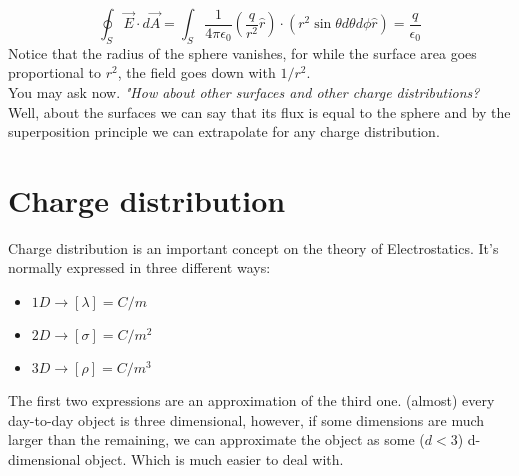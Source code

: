		\begin{equation}
			\oint_S \vec{E} \cdot d\vec{A} = \int_S \frac{1}{4\pi\epsilon_0} \left(\frac{q}{r^2}\hat{r}\right)\cdot(r^2\sin\theta d\theta d\phi \hat{r}) = \frac{q}{\epsilon_0}
		\end{equation}
		Notice that the radius of the sphere vanishes, for while the surface area goes proportional to $r^2$, the field goes down with $1/r^2$.\\
		You may ask now. \textit{"How about other surfaces and other charge distributions?} Well, about the surfaces we can say that its flux is equal to the sphere and by the superposition principle we can extrapolate for any charge distribution. %


\section{Charge distribution}
	Charge distribution is an important concept on the theory of Electrostatics. It's normally expressed in three different ways:
	\begin{itemize}
		\item $1D \longrightarrow [\lambda] = C/m$
		\item $2D \longrightarrow [\sigma] = C/m^2$
		\item $3D \longrightarrow [\rho] = C/m^3$
	\end{itemize}
	The first two expressions are an approximation of the third one. (almost) every day-to-day object is three dimensional, however, if some dimensions are much larger than the remaining, we can approximate the object as some ($d<3$) d-dimensional object. Which is much easier to deal with.

	
